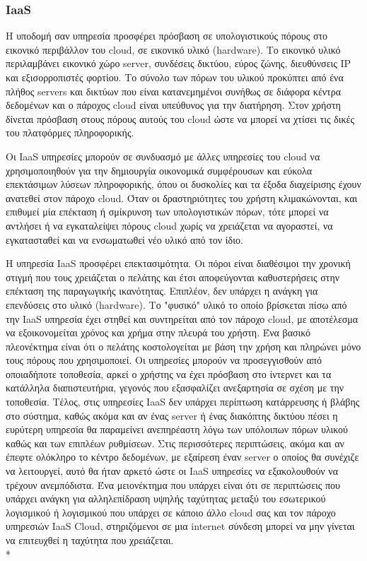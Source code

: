 		\subsubsection{IaaS}

		Η υποδομή σαν υπηρεσία προσφέρει πρόσβαση σε υπολογιστικούς πόρους στο εικονικό περιβάλλον του cloud, σε εικονικό υλικό (hardware). Το εικονικό υλικό περιλαμβάνει εικονικό χώρο server, συνδέσεις δικτύου, εύρος ζώνης, διευθύνσεις IP  και εξισορροπιστές φορτίου. Το σύνολο των πόρων του υλικού προκύπτει από ένα πλήθος servers και δικτύων που είναι κατανεμημένοι συνήθως σε διάφορα κέντρα δεδομένων και ο πάροχος cloud είναι υπεύθυνος για την διατήρηση. Στον χρήστη δίνεται πρόσβαση στους πόρους αυτούς του cloud ώστε να μπορεί να χτίσει τις δικές του πλατφόρμες πληροφορικής. 
		
		Οι IaaS υπηρεσίες μπορούν σε συνδυασμό με άλλες υπηρεσίες του cloud να χρησιμοποιηθούν για την δημιουργία οικονομικά συμφέρουσων και εύκολα επεκτάσιμων λύσεων πληροφορικής, όπου οι δυσκολίες και τα έξοδα διαχείρισης έχουν ανατεθεί στον πάροχο cloud. Όταν οι δραστηριότητες του χρήστη κλιμακώνονται, και επιθυμεί μία επέκταση ή σμίκρυνση των υπολογιστικών πόρων, τότε μπορεί να αντλήσει ή να εγκαταλείψει πόρους cloud χωρίς να χρειάζεται να αγοραστεί, να εγκατασταθεί και να ενσωματωθεί νέο υλικό από τον ίδιο. \cite{IaasService}
		
		Η υπηρεσία IaaS προσφέρει επεκτασιμότητα. Οι πόροι είναι διαθέσιμοι την χρονική στιγμή που τους χρειάζεται ο πελάτης και έτσι αποφεύγονται καθυστερήσεις στην επέκταση της παραγωγικής ικανότητας. Επιπλέον, δεν υπάρχει η ανάγκη για επενδύσεις στο υλικό (hardware).  Το "φυσικό" υλικό το οποίο βρίσκεται πίσω από την IaaS υπηρεσία έχει στηθεί και συντηρείται από τον πάροχο cloud, με αποτέλεσμα να εξοικονομείται χρόνος και χρήμα στην πλευρά του χρήστη.  Ένα βασικό πλεονέκτημα  είναι ότι ο πελάτης κοστολογείται με βάση την χρήση και πληρώνει μόνο τους πόρους που χρησιμοποιεί. Οι υπηρεσίες μπορούν να προσεγγισθούν από οποιαδήποτε τοποθεσία, αρκεί ο χρήστης να έχει πρόσβαση στο ίντερνετ και τα κατάλληλα διαπιστευτήρια, γεγονός που εξασφαλίζει ανεξαρτησία σε σχέση με την τοποθεσία. Τέλος, στις υπηρεσίες IaaS δεν υπάρχει περίπτωση κατάρρευσης ή βλάβης στο σύστημα, καθώς ακόμα και αν ένας server ή ένας διακόπτης δικτύου πέσει η ευρύτερη υπηρεσία θα παραμείνει ανεπηρέαστη λόγω των υπόλοιπων πόρων υλικού καθώς και των επιπλέων ρυθμίσεων. Στις περισσότερες περιπτώσεις, ακόμα και αν έπεφτε ολόκληρο το κέντρο δεδομένων, με εξαίρεση έναν server ο οποίος θα συνέχιζε να λειτουργεί, αυτό θα ήταν αρκετό ώστε οι IaaS υπηρεσίες να εξακολουθούν να τρέχουν ανεμπόδιστα. Ένα μειονέκτημα που υπάρχει είναι ότι σε περιπτώσεις που υπάρχει ανάγκη για αλληλεπίδραση υψηλής ταχύτητας μεταξύ του εσωτερικού λογισμικού ή λογισμικού που υπάρχει σε κάποιο άλλο cloud σας και τον πάροχο υπηρεσιών IaaS Cloud, στηριζόμενοι σε μια internet σύνδεση μπορεί να μην γίνεται να επιτευχθεί η ταχύτητα που χρειάζεται. \cite{images}
	\\*	
		
